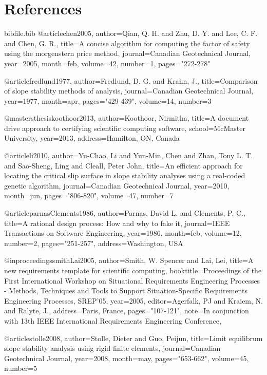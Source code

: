 \documentclass[12pt]{article}
\begin{document}
\section{References}
\label{Sec:References}
\begin{filecontents*}{bibfile.bib}
@article{chen2005,
author={Qian, Q. H. and Zhu, D. Y. and Lee, C. F. and Chen, G. R.},
title={A concise algorithm for computing the factor of safety using the morgenstern price method},
journal={Canadian Geotechnical Journal},
year={2005},
month={feb},
volume={42},
number={1},
pages={"272-278"}}

@article{fredlund1977,
author={Fredlund, D. G. and Krahn, J.},
title={Comparison of slope stability methods of analysis},
journal={Canadian Geotechnical Journal},
year={1977},
month={apr},
pages={"429-439"},
volume={14},
number={3}}

@mastersthesis{koothoor2013,
author={Koothoor, Nirmitha},
title={A document drive approach to certifying scientific computing software},
school={McMaster University},
year={2013},
address={Hamilton, ON, Canada}}

@article{li2010,
author={Yu-Chao, Li and Yun-Min, Chen and Zhan, Tony L. T. and Sao-Sheng, Ling and Cleall, Peter John},
title={An efficient approach for locating the critical slip surface in slope stability analyses using a real-coded genetic algorithm},
journal={Canadian Geotechnical Journal},
year={2010},
month={jun},
pages={"806-820"},
volume={47},
number={7}}

@article{parnasClements1986,
author={Parnas, David L. and Clements, P. C.},
title={A rational design process: How and why to fake it},
journal={IEEE Transactions on Software Engineering},
year={1986},
month={feb},
volume={12},
number={2},
pages={"251-257"},
address={Washington, USA}}

@inproceedings{smithLai2005,
author={Smith, W. Spencer and Lai, Lei},
title={A new requirements template for scientific computing},
booktitle={Proceedings of the First International Workshop on Situational Requirements Engineering Processes - Methods, Techniques and Tools to Support Situation-Specific Requirements Engineering Processes, SREP'05},
year={2005},
editor={Agerfalk, PJ and Kraiem, N. and Ralyte, J.},
address={Paris, France},
pages={"107-121"},
note={In conjunction with 13th IEEE International Requirements Engineering Conference,}}

@article{stolle2008,
author={Stolle, Dieter and Guo, Peijun},
title={Limit equilibrum slope stability analysis using rigid finite elements},
journal={Canadian Geotechnical Journal},
year={2008},
month={may},
pages={"653-662"},
volume={45},
number={5}}
\end{filecontents*}
\nocite{*}
\printbibliography[heading=none]
\end{document}
